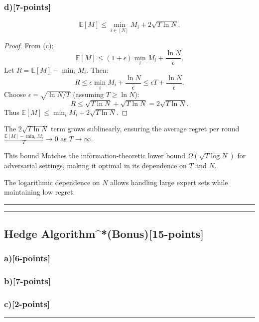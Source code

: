 \documentclass[12pt]{article}
\begin{document}
\subsubsection{d)[7-points]}
\[
\mathbb{E}[M] \leq \min_{i \in [N]} M_i + 2\sqrt{T \ln N}.
\]

\begin{proof}
From (c):
\[
\mathbb{E}[M] \leq (1 + \epsilon) \min_i M_i + \frac{\ln N}{\epsilon}.
\]
Let $R = \mathbb{E}[M] - \min_i M_i$. Then:
\[
R \leq \epsilon \min_i M_i + \frac{\ln N}{\epsilon} \leq \epsilon T + \frac{\ln N}{\epsilon}.
\]
Choose $\epsilon = \sqrt{\ln N / T}$ (assuming $T \geq \ln N$):
\[
R \leq \sqrt{T \ln N} + \sqrt{T \ln N} = 2\sqrt{T \ln N}.
\]
Thus $\mathbb{E}[M] \leq \min_i M_i + 2\sqrt{T \ln N}$.

\end{proof}

The $2\sqrt{T \ln N}$ term grows sublinearly, ensuring the average regret per round $\frac{\mathbb{E}[M] - \min_i M_i}{T} \to 0$ as $T \to \infty$.
    
This bound Matches the information-theoretic lower bound $\Omega(\sqrt{T \log N})$ for adversarial settings, making it optimal in its dependence on $T$ and $N$.
    
The logarithmic dependence on $N$ allows handling large expert sets while maintaining low regret.

\noindent\rule{\textwidth}{0.2pt}
\noindent\rule{\textwidth}{0.2pt}
\subsection{Hedge Algorithm^*(Bonus)[15-points]}
\subsubsection{a)[6-points]}
\subsubsection{b)[7-points]}
\subsubsection{c)[2-points]}

\noindent\rule{\textwidth}{0.4pt}






\end{document}
